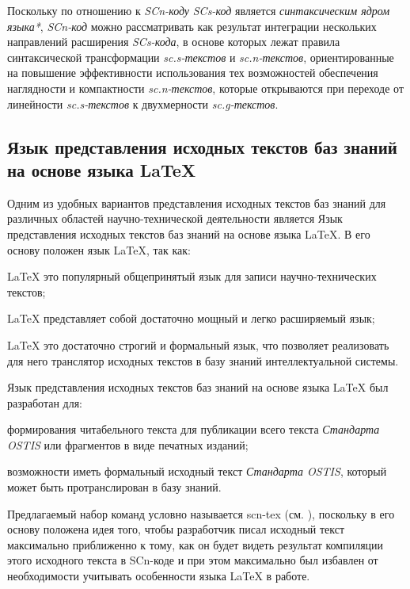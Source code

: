 Поскольку по отношению к \textit{SCn-коду} \textit{SCs-код} является \textit{синтаксическим ядром языка*}, \textit{SCn-код} можно рассматривать как результат интеграции нескольких направлений расширения \textit{SCs-кода}, в основе которых лежат правила синтаксической трансформации \textit{sc.s-текстов} и \textit{sc.n-текстов}, ориентированные на повышение эффективности использования тех возможностей обеспечения наглядности и компактности \textit{sc.n-текстов}, которые открываются при переходе от линейности \textit{sc.s-текстов} к двухмерности \textit{sc.g-текстов}.

\subsection{Язык представления исходных текстов баз знаний на основе языка LaTeX}
\label{subsec_latex}

Одним из удобных вариантов представления исходных текстов баз знаний для различных областей научно-технической деятельности является Язык представления исходных текстов баз знаний на основе языка LaTeX. В его основу положен язык LaTeX, так как:
\begin{textitemize}
	\item LaTeX это популярный общепринятый язык для записи научно-технических текстов;
	\item LaTeX представляет собой достаточно мощный и легко расширяемый язык;
	\item LaTeX это достаточно строгий и формальный язык, что позволяет реализовать для него транслятор исходных текстов в базу знаний интеллектуальной системы.
\end{textitemize}

Язык представления исходных текстов баз знаний на основе языка LaTeX был разработан для:
\begin{textitemize}
	\item формирования читабельного текста для публикации всего текста \textit{Стандарта OSTIS} или фрагментов в виде печатных изданий;
	\item возможности иметь формальный исходный текст \textit{Стандарта OSTIS}, который может быть протранслирован в базу знаний.
\end{textitemize}

Предлагаемый набор команд условно называется scn-tex (см. ), поскольку в его основу положена идея того, чтобы разработчик писал исходный текст максимально приближенно к тому, как он будет видеть результат компиляции этого исходного текста в SCn-коде и при этом максимально был избавлен от необходимости учитывать особенности языка LaTeX в работе.

